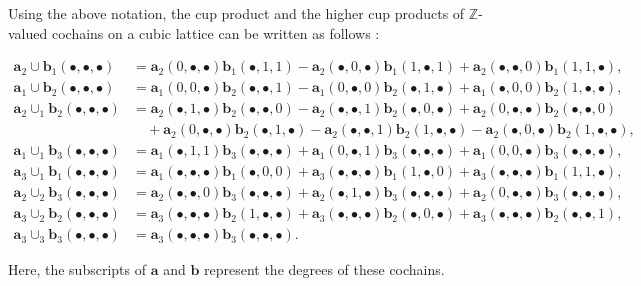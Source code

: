 \documentclass[aps,twocolumn,prx,floatfix,preprintnumbers, nofootinbib,10pt]{revtex4-2}
\numberwithin{equation}{section}
\theoremstyle{definition}
\theoremstyle{remark}
\theoremstyle{claim}
\begin{document}
\vspace{\baselineskip}
Using the above notation, the cup product and the higher cup products of $\mathbb{Z}$-valued cochains on a cubic lattice can be written as follows \cite[Appendix B]{MengSun2026}:
\begin{widetext}
\begin{align}
\bm{a}_2 \cup \bm{b}_1 (\bullet, \bullet, \bullet) &= \bm{a}_2(0, \bullet, \bullet) \bm{b}_1(\bullet, 1, 1) - \bm{a}_2(\bullet, 0, \bullet) \bm{b}_1(1, \bullet, 1) + \bm{a}_2(\bullet, \bullet, 0) \bm{b}_1(1, 1, \bullet), \\
\bm{a}_1 \cup \bm{b}_2 (\bullet, \bullet, \bullet) &= \bm{a}_1(0, 0, \bullet) \bm{b}_2(\bullet, \bullet, 1) - \bm{a}_1(0, \bullet, 0) \bm{b}_2(\bullet, 1, \bullet) + \bm{a}_1(\bullet, 0, 0) \bm{b}_2(1, \bullet, \bullet), \\
\bm{a}_2 \cup_1 \bm{b}_2 (\bullet, \bullet, \bullet) &= \bm{a}_2(\bullet, 1, \bullet) \bm{b}_2(\bullet, \bullet, 0) - \bm{a}_2(\bullet, \bullet, 1) \bm{b}_2(\bullet, 0, \bullet) +\bm{a}_2(0, \bullet, \bullet) \bm{b}_2(\bullet, \bullet, 0) \\
&\quad + \bm{a}_2(0, \bullet, \bullet) \bm{b}_2(\bullet, 1, \bullet) - \bm{a}_2(\bullet, \bullet, 1) \bm{b}_2(1, \bullet, \bullet) - \bm{a}_2(\bullet, 0, \bullet) \bm{b}_2(1, \bullet, \bullet), \\
\bm{a}_1 \cup_1 \bm{b}_3 (\bullet, \bullet, \bullet) &= \bm{a}_1(\bullet, 1, 1) \bm{b}_3(\bullet, \bullet, \bullet) + \bm{a}_1(0, \bullet, 1) \bm{b}_3(\bullet, \bullet, \bullet) + \bm{a}_1(0, 0, \bullet) \bm{b}_3(\bullet, \bullet, \bullet), \\
\bm{a}_3 \cup_1 \bm{b}_1 (\bullet, \bullet, \bullet) &= \bm{a}_1(\bullet, \bullet, \bullet) \bm{b}_1(\bullet, 0, 0) + \bm{a}_3(\bullet, \bullet, \bullet) \bm{b}_1(1, \bullet, 0) + \bm{a}_3(\bullet, \bullet, \bullet) \bm{b}_1(1, 1, \bullet), \\
\bm{a}_2 \cup_2 \bm{b}_3 (\bullet, \bullet, \bullet) &= \bm{a}_2(\bullet, \bullet, 0) \bm{b}_3(\bullet, \bullet, \bullet) + \bm{a}_2(\bullet, 1, \bullet) \bm{b}_3(\bullet, \bullet, \bullet) + \bm{a}_2(0, \bullet, \bullet) \bm{b}_3(\bullet, \bullet, \bullet), \\
\bm{a}_3 \cup_2 \bm{b}_2 (\bullet, \bullet, \bullet) &= \bm{a}_3(\bullet, \bullet, \bullet) \bm{b}_2(1, \bullet, \bullet) + \bm{a}_3(\bullet, \bullet, \bullet) \bm{b}_2(\bullet, 0, \bullet) + \bm{a}_3(\bullet, \bullet, \bullet) \bm{b}_2(\bullet, \bullet, 1), \\
\bm{a}_3 \cup_3 \bm{b}_3 (\bullet, \bullet, \bullet) &= \bm{a}_3(\bullet, \bullet, \bullet) \bm{b}_3(\bullet, \bullet, \bullet).
\end{align}
\end{widetext}
Here, the subscripts of $\bm{a}$ and $\bm{b}$ represent the degrees of these cochains.
\end{document}
